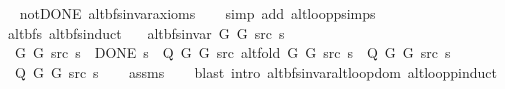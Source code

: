 \begin{isabellebody}
\endisataginvisible
{\isafoldinvisible}%
%
\isadeliminvisible
\isanewline
%
\endisadeliminvisible
%
\isadelimproof
\ \ %
\endisadelimproof
%
\isatagproof
{}\isamarkupfalse%
\ not{\isacharunderscore}{\kern0pt}DONE\ alt{\isacharunderscore}{\kern0pt}bfs{\isacharunderscore}{\kern0pt}invar{\isacharunderscore}{\kern0pt}axioms\isanewline
\ \ \isamarkupfalse%
\ {\isacharparenleft}{\kern0pt}simp\ add{\isacharcolon}{\kern0pt}\ alt{\isacharunderscore}{\kern0pt}loop{\isacharunderscore}{\kern0pt}psimps{\isacharparenright}{\kern0pt}%
\endisatagproof
{\isafoldproof}%
%
\isadelimproof
\isanewline
%
\endisadelimproof
%
\isadeliminvisible
\isanewline
%
\endisadeliminvisible
%
\isataginvisible
{}\isamarkupfalse%
\ {\isacharparenleft}{\kern0pt}\ alt{\isacharunderscore}{\kern0pt}bfs{\isacharparenright}{\kern0pt}\ alt{\isacharunderscore}{\kern0pt}bfs{\isacharunderscore}{\kern0pt}induct{\isacharcolon}{\kern0pt}\isanewline
\ \ \ {\isachardoublequoteopen}alt{\isacharunderscore}{\kern0pt}bfs{\isacharunderscore}{\kern0pt}invar{\isacharprime}{\kern0pt}\ G{}\ G{}\ src\ s{\isachardoublequoteclose}\isanewline
\ \ \ {\isachardoublequoteopen}{\isasymAnd}G{}\ G{}\ src\ s{\isachardot}{\kern0pt}\ {\isacharparenleft}{\kern0pt}{\isasymnot}\ DONE\ s\ {\isasymLongrightarrow}\ Q\ G{}\ G{}\ src\ {\isacharparenleft}{\kern0pt}alt{\isacharunderscore}{\kern0pt}fold\ G{}\ G{}\ src\ s{\isacharparenright}{\kern0pt}{\isacharparenright}{\kern0pt}\ {\isasymLongrightarrow}\ Q\ G{}\ G{}\ src\ s{\isachardoublequoteclose}\isanewline
\ \ \ {\isachardoublequoteopen}Q\ G{}\ G{}\ src\ s{\isachardoublequoteclose}%
\endisataginvisible
{\isafoldinvisible}%
%
\isadeliminvisible
\isanewline
%
\endisadeliminvisible
%
\isadelimproof
\ \ %
\endisadelimproof
%
\isatagproof
{}\isamarkupfalse%
\ assms\isanewline
\ \ \isamarkupfalse%
\ {\isacharparenleft}{\kern0pt}blast\ intro{\isacharcolon}{\kern0pt}\ alt{\isacharunderscore}{\kern0pt}bfs{\isacharunderscore}{\kern0pt}invar{\isachardot}{\kern0pt}alt{\isacharunderscore}{\kern0pt}loop{\isacharunderscore}{\kern0pt}dom\ alt{\isacharunderscore}{\kern0pt}loop{\isachardot}{\kern0pt}pinduct{\isacharparenright}{\kern0pt}%
\endisatagproof
{\isafoldproof}%
%
\isadelimproof
%
\endisadelimproof
%
\isadelimdocument
%
\endisadelimdocument
%
\isatagdocument
%
\isamarkuptrue%

\end{isabellebody}
